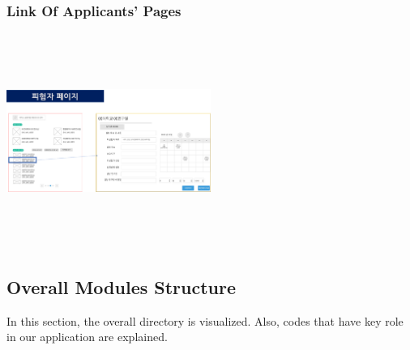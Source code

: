 \documentclass[letterpaper, 10 pt, conference]{ieeeconf}  %
\begin{document}

\subsubsection{Link Of Applicants' Pages\\}

\includegraphics[width=0.5\textwidth,height = 7cm]{Oven/16_linkOfApplicantPages.png}

\subsection{Overall Modules Structure} %
In this section, the overall directory is visualized. Also, codes that have key role in our application are explained. \\
\end{document}
